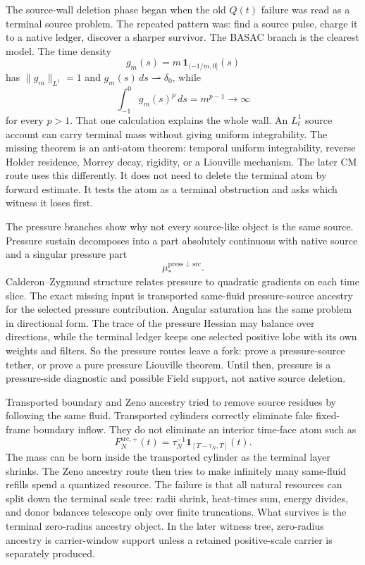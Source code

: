 The source-wall deletion phase began when the old \(Q(t)\) failure was read as
a terminal source problem.
The repeated pattern was:
find a source pulse, charge it to a native ledger, discover a sharper survivor.
The BASAC branch is the clearest model.
The time density
\[
  g_m(s)=m\,\mathbf 1_{(-1/m,0]}(s)
\]
has \(\|g_m\|_{L^1}=1\) and
\(g_m(s)\,ds\rightharpoonup\delta_0\), while
\[
  \int_{-1}^0g_m(s)^p\,ds=m^{p-1}\to\infty
\]
for every \(p>1\).
That one calculation explains the whole wall.
An \(L^1_t\) source account can carry terminal mass without giving uniform
integrability.
The missing theorem is an anti-atom theorem: temporal uniform integrability,
reverse Holder residence, Morrey decay, rigidity, or a Liouville mechanism.
The later CM route uses this differently.
It does not need to delete the terminal atom by forward estimate.
It tests the atom as a terminal obstruction and asks which witness it loses
first.

The pressure branches show why not every source-like object is the same source.
Pressure sustain decomposes into a part absolutely continuous with native source
and a singular pressure part
\[
  \mu_*^{\mathrm{press}\perp\mathrm{src}} .
\]
Calderon--Zygmund structure relates pressure to quadratic gradients on each
time slice.
The exact missing input is transported same-fluid pressure-source ancestry for
the selected pressure contribution.
Angular saturation has the same problem in directional form.
The trace of the pressure Hessian may balance over directions, while the
terminal ledger keeps one selected positive lobe with its own weights and
filters.
So the pressure routes leave a fork: prove a pressure-source tether, or prove a
pure pressure Liouville theorem.
Until then, pressure is a pressure-side diagnostic and possible Field support,
not native source deletion.

Transported boundary and Zeno ancestry tried to remove source residues by
following the same fluid.
Transported cylinders correctly eliminate fake fixed-frame boundary inflow.
They do not eliminate an interior time-face atom such as
\[
  F_N^{\mathrm{src},+}(t)
  =
  \tau_N^{-1}\mathbf 1_{[T-\tau_N,T]}(t).
\]
The mass can be born inside the transported cylinder as the terminal layer
shrinks.
The Zeno ancestry route then tries to make infinitely many same-fluid refills
spend a quantized resource.
The failure is that all natural resources can split down the terminal scale
tree: radii shrink, heat-times sum, energy divides, and donor balances telescope
only over finite truncations.
What survives is the terminal zero-radius ancestry object.
In the later witness tree, zero-radius ancestry is carrier-window support unless a retained
positive-scale carrier is separately produced.

